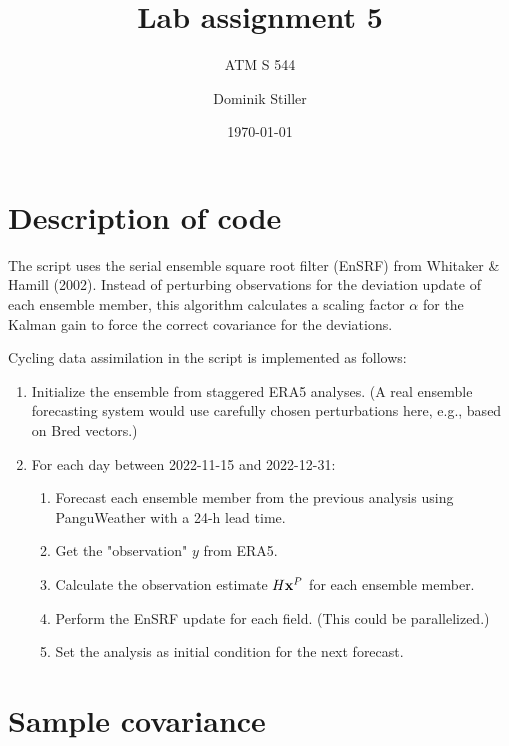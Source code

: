 \documentclass[parskip=half,DIV=16]{scrartcl}
\title{Lab assignment 5}
\subtitle{ATM S 544}
\author{Dominik Stiller}
\date{\today}
\begin{document}
\maketitle



\section{Description of code}

The script uses the serial ensemble square root filter (EnSRF) from Whitaker \& Hamill (2002). Instead of perturbing observations for the deviation update of each ensemble member, this algorithm calculates a scaling factor $\alpha$ for the Kalman gain to force the correct covariance for the deviations.

Cycling data assimilation in the script is implemented as follows:
\begin{enumerate}
   \item Initialize the ensemble from staggered ERA5 analyses. (A real ensemble forecasting system would use carefully chosen perturbations here, e.g., based on Bred vectors.)
   \item For each day between 2022-11-15 and 2022-12-31:
   \begin{enumerate}
      \item Forecast each ensemble member from the previous analysis using PanguWeather with a 24-h lead time.
      \item Get the "observation" $y$ from ERA5.
      \item Calculate the observation estimate $H \vb{x}^P$ for each ensemble member.
      \item Perform the EnSRF update for each field. (This could be parallelized.)
      \item Set the analysis as initial condition for the next forecast.
   \end{enumerate}
\end{enumerate}



\newpage
\section{Sample covariance}
\end{document}
